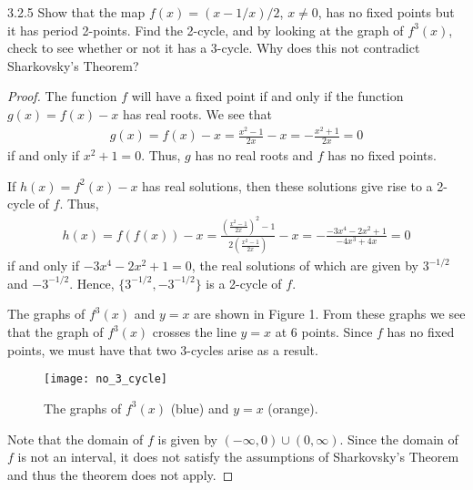 \begin{problem}{3.2.5}
  Show that the map $f(x) = (x - 1/x)/2$, $x \neq 0$, has no fixed points but it has
  period 2-points. Find the 2-cycle, and by looking at the graph of $f^3 (x)$, check to see
  whether or not it has a 3-cycle. Why does this not contradict Sharkovsky’s Theorem?
\end{problem}

\begin{proof}The function $f$ will have a fixed point if and only if the function $g(x) = f(x) - x$
  has real roots. We see that
  \begin{align*}
    g(x) = f(x) - x = \frac{x^2-1}{2x} - x = -\frac{x^2+1}{2x} = 0
  \end{align*}
  if and only if $x^2 + 1 =0$. Thus, $g$ has no real roots and $f$ has no fixed points.

  If $h(x) = f^2(x) - x$ has real solutions, then these solutions give rise to a 2-cycle of $f$.
  Thus,
  \begin{align*}
    h(x) = f(f(x)) - x = \frac{\left(\frac{x^2-1}{2x}\right)^2-1}{2\left(\frac{x^2-1}{2x}\right)} - x
    = -\frac{- 3 x^4 - 2 x^2 + 1}{-4x^3 + 4 x}= 0
  \end{align*}
  if and only if $- 3 x^4 - 2 x^2 + 1=0$, the real solutions of which are given by $3^{-1/2}$ and $-3^{-1/2}$.
  Hence, $\{3^{-1/2}, -3^{-1/2}\}$ is a 2-cycle of $f$.

  The graphs of $f^3(x)$ and $y=x$ are shown in Figure 1. From these graphs we see that
  the graph of $f^3(x)$ crosses the line $y=x$ at 6 points. Since $f$ has no fixed points,
  we must have that two 3-cycles arise as a result.

  \begin{figure}[!h]
    \centerline{\texttt{[image: no\_3\_cycle]}}
    \caption{The graphs of $f^3(x)$ (blue) and $y=x$ (orange).}
  \end{figure}


  Note that the domain of $f$ is given by $(-\infty, 0) \cup (0, \infty)$. Since the domain of $f$ is
  not an interval, it does not satisfy the assumptions of Sharkovsky's Theorem
  and thus the theorem does not apply.

\end{proof}
\newpage
